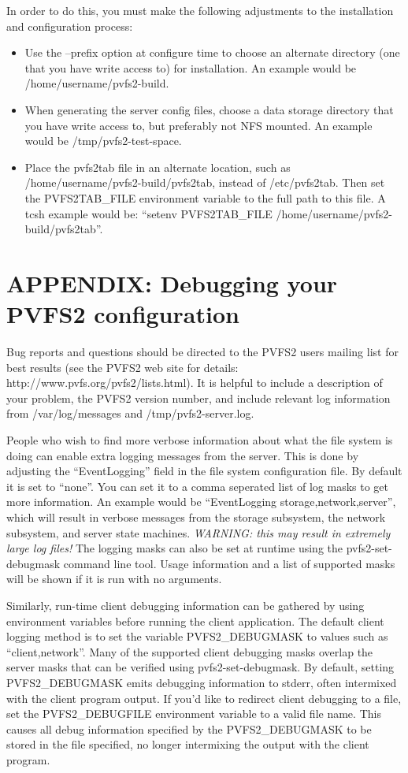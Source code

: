 \documentclass[11pt, letterpaper]{article}
\begin{document}
In order to do this, you must make the following adjustments to the
installation and configuration process:
\begin{itemize}
\item Use the --prefix option at configure time to choose an alternate
directory (one that you have write access to) for installation.  An example
would be /home/username/pvfs2-build.
\item When generating the server config files, choose a data storage
directory that you have write access to, but preferably not NFS mounted.  An
example would be /tmp/pvfs2-test-space.
\item Place the pvfs2tab file in an alternate location, such as
/home/username/pvfs2-build/pvfs2tab, instead of /etc/pvfs2tab.
Then set the PVFS2TAB\_FILE environment variable to the full path
to this file.  A tcsh example would be: ``setenv PVFS2TAB\_FILE
/home/username/pvfs2-build/pvfs2tab''.
\end{itemize}


\section{APPENDIX: Debugging your PVFS2 configuration}

Bug reports and questions should be directed to the PVFS2 users mailing list
for best results (see the PVFS2 web site for details:
http://www.pvfs.org/pvfs2/lists.html).  It is helpful to
include a description of your problem, the PVFS2 version number, and include
relevant log information from /var/log/messages and /tmp/pvfs2-server.log. 

People who wish to find more verbose information about what the file
system is doing can enable extra logging messages from the server.
This is done by adjusting the ``EventLogging'' field in the file system
configuration file.  By default it is set to ``none''.  You can set it to
a comma seperated list of log masks to get more information.  An example
would be ``EventLogging storage,network,server'', which will result
in verbose messages from the storage subsystem, the network subsystem,
and server state machines.  \emph{WARNING: this may result in extremely
large log files!}  The logging masks can also be set at runtime using the
pvfs2-set-debugmask command line tool.  Usage information and a list of
supported masks will be shown if it is run with no arguments.

Similarly, run-time client debugging information can be gathered by
using environment variables before running the client application.
The default client logging method is to set the variable
PVFS2\_DEBUGMASK to values such as ``client,network''.  Many of the
supported client debugging masks overlap the server masks that can be
verified using pvfs2-set-debugmask.  By default, setting
PVFS2\_DEBUGMASK emits debugging information to stderr, often
intermixed with the client program output.  If you'd like to redirect
client debugging to a file, set the PVFS2\_DEBUGFILE environment
variable to a valid file name.  This causes all debug information
specified by the PVFS2\_DEBUGMASK to be stored in the file specified,
no longer intermixing the output with the client program.
\end{document}
